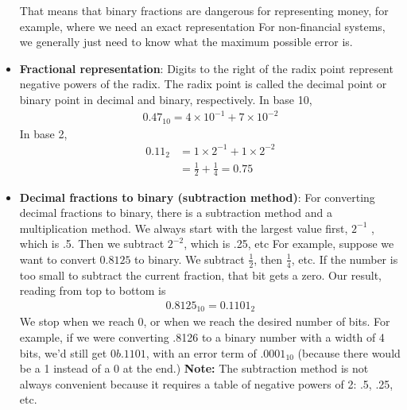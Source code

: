 \documentclass{report}
\begin{document}
\begin{itemize}
            \bigbreak \noindent 
            That means that binary fractions are dangerous for representing money, for example, where we need an exact representation
            \bigbreak \noindent 
            For non-financial systems, we generally just need to know what the maximum possible error is.
        \item \textbf{Fractional representation}: Digits to the right of the radix point represent negative powers of the radix.
            \bigbreak \noindent 
            The radix point is called the decimal point or binary point in decimal and binary, respectively.
            \bigbreak \noindent 
            In base 10,
            \begin{align*}
                0.47_{10} = 4 \times 10^{-1} + 7 \times 10^{-2}
            \end{align*}
            In base 2,
            \begin{align*}
                0.11_{2} &= 1 \times 2^{-1} + 1 \times 2^{-2} \\
                         &= \frac{1}{2} + \frac{1}{4} = 0.75
            \end{align*}
        \item \textbf{Decimal fractions to binary (subtraction method)}: For converting decimal fractions to binary, there is a subtraction method and a multiplication method.
            \bigbreak \noindent 
            We always start with the largest value first, $2^{-1}$ , which is .5. Then we subtract $2^{-2} $, which is .25, etc
            \bigbreak \noindent 
            For example, suppose we want to convert $0.8125$ to binary. We subtract $\frac{1}{2}$, then $\frac{1}{4}$, etc. If the number is too small to subtract the current fraction, that bit gets a zero.
            \bigbreak \noindent 
            \bigbreak \noindent 
            Our result, reading from top to bottom is
            \begin{align*}
                0.8125_{10} = 0.1101_{2}
            \end{align*}
            \bigbreak \noindent 
            We stop when we reach 0, or when we reach the desired number of bits.
            \bigbreak \noindent 
            For example, if we were converting .8126 to a binary number with a width of 4 bits, we’d still get $0b.1101$, with an error term of $.0001_{10}$ (because there would be a 1 instead of a 0 at the end.)
            \bigbreak \noindent 
            \textbf{Note:} The subtraction method is not always convenient because it requires a table of negative powers of 2: .5, .25, etc.

\end{itemize}
\end{document}
